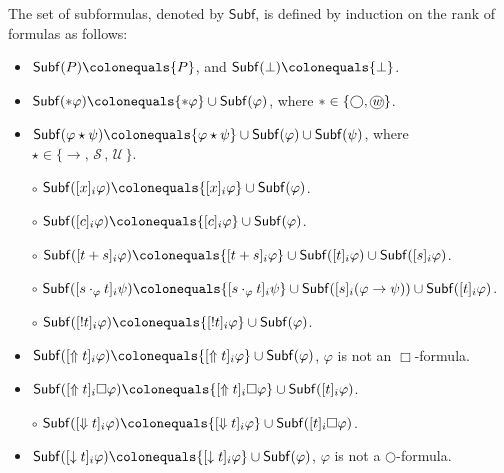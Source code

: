 \documentclass[envcountsect,envcountsame,oribibl,orivec]{llncs}
\newcommand*\circled[1]{\tikz[baseline=(char.base)]{
		\node[shape=circle,draw,inner sep=0.4pt] (char) {#1};}}
\newcommand{\lnext}{\bigcirc}
\newcommand{\lalways}{\Box}
\newcommand{\luntil}{{\,\mathcal{U}\,}}
\newcommand{\lsince}{{\,\mathcal{S}\,}}
\newcommand{\wprevious}{\circled{\textit{w}}}
\newcommand{\jbox}[1]{\left[#1\right]\!}
\newcommand{\talwaysaccess}{\Downarrow}
\newcommand{\tgeneralize}{\Uparrow}
\newcommand{\tnextaccess}{\downarrow}
\newcommand{\agent}{i}
\renewcommand{\phi}{\varphi}
\newcommand{\Subf}{\mathsf{Subf}}
\begin{document}
\begin{definition}\label{def:Subf}
	The set of subformulas, denoted by $\Subf$,
	is defined by induction on the rank of formulas as follows:
	
	\begin{itemize}
		\setlength\itemsep{0.01cm}
		\item $ \Subf(P) \colonequals \{P\}$, and $ \Subf(\bot) \colonequals \{\bot\}$.
		\item $ \Subf(* \phi) \colonequals \{* \phi\} \cup  \Subf(\phi)$, where $* \in \{ \lnext, \wprevious \}$.
		\item $ \Subf(\phi \star \psi) \colonequals \{\phi \star \psi\} \cup  \Subf(\phi) \cup  \Subf(\psi)$, where $\star \in \{ \to, \lsince, \luntil \}$.
		\vspace*{0.1cm}
		\item[$\circ$] $\Subf(\jbox{x}_\agent \phi) \colonequals \{\jbox{x}_\agent \phi\} \cup \Subf(\phi)$.
		\item[$\circ$] $\Subf(\jbox{c}_\agent \phi) \colonequals \{\jbox{c}_\agent \phi\} \cup \Subf(\phi)$.
		\item[$\circ$] $\Subf(\jbox{t+s}_\agent \phi) \colonequals \{\jbox{t+s}_\agent \phi\} \cup \Subf(\jbox{t}_\agent \phi) \cup \Subf(\jbox{s}_\agent \phi)$.
		\item[$\circ$] $\Subf(\jbox{s \cdot_\phi t}_\agent \psi) \colonequals \{\jbox{s \cdot_\phi t}_\agent  \psi\} \cup \Subf(\jbox{s}_\agent (\phi \to \psi)) \cup \Subf(\jbox{t}_\agent \phi)$.
		\item[$\circ$] $\Subf(\jbox{!t}_\agent \phi) \colonequals \{\jbox{!t}_\agent \phi\} \cup \Subf(\phi)$.
		\vspace*{0.1cm}
		\item $\Subf(\jbox{\tgeneralize t}_\agent \phi) \colonequals \{\jbox{\tgeneralize t}_\agent \phi\} \cup \Subf(\phi)$, $\phi$ is not an $\lalways$-formula.
		\item $\Subf(\jbox{\tgeneralize t}_\agent \lalways \phi) \colonequals \{\jbox{\tgeneralize t }_\agent \lalways\phi\} \cup \Subf(\jbox{t}_\agent \phi)$.
		\vspace*{0.1cm}
		\item[$\circ$] $\Subf(\jbox{\talwaysaccess t}_\agent \phi) \colonequals \{\jbox{\talwaysaccess t }_\agent \phi\} \cup \Subf(\jbox{t}_\agent \lalways \phi)$.
		\vspace*{0.1cm}
		\item $\Subf(\jbox{\tnextaccess t}_\agent \phi) \colonequals \{\jbox{\tnextaccess t}_\agent \phi\} \cup \Subf(\phi)$, $\phi$ is not a $\lnext$-formula.

\end{itemize}
\end{definition}
\end{document}
